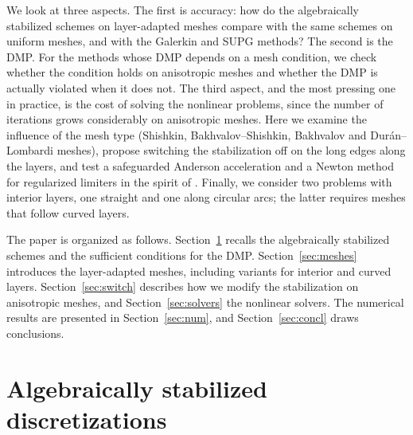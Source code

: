 \documentclass[11pt,a4paper]{article}
\theoremstyle{remark}
\begin{document}
We look at three aspects. The first is accuracy: how do the algebraically stabilized schemes on layer-adapted meshes
compare with the same schemes on uniform meshes, and with the Galerkin and SUPG methods? The second is the DMP. For
the methods whose DMP depends on a mesh condition, we check whether the condition holds on anisotropic meshes and
whether the DMP is actually violated when it does not. The third aspect, and the most pressing one in practice, is
the cost of solving the nonlinear problems, since the number of iterations grows considerably on anisotropic
meshes. Here we examine the influence of the mesh type (Shishkin, Bakhvalov--Shishkin, Bakhvalov and
Dur\'an--Lombardi \cite{DL06} meshes), propose switching the stabilization off on the long edges along the layers,
and test a safeguarded Anderson acceleration \cite{WN11} and a Newton method for regularized limiters in the spirit
of \cite{BB17}. Finally, we consider two problems with interior layers, one straight and one along circular arcs;
the latter requires meshes that follow curved layers.

The paper is organized as follows. Section~\ref{sec:disc} recalls the algebraically stabilized schemes and the
sufficient conditions for the DMP. Section~\ref{sec:meshes} introduces the layer-adapted meshes, including variants
for interior and curved layers. Section~\ref{sec:switch} describes how we modify the stabilization on anisotropic
meshes, and Section~\ref{sec:solvers} the nonlinear solvers. The numerical results are presented in
Section~\ref{sec:num}, and Section~\ref{sec:concl} draws conclusions.

\section{Algebraically stabilized discretizations}\label{sec:disc}
\end{document}
